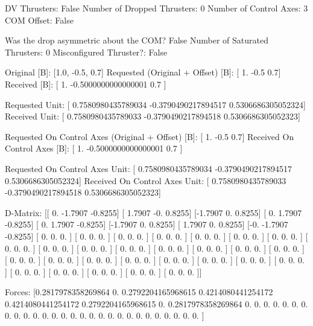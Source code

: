 DV Thrusters:	False
Number of Dropped Thrusters:	0
Number of Control Axes:	3
COM Offset:	False

Was the drop asymmetric about the COM?	False
Number of Saturated Thrusters:	0
Misconfigured Thruster?:	False

Original [B]:	[1.0, -0.5, 0.7]
Requested (Original + Offset) [B]:	[ 1.  -0.5  0.7]
Received [B]:		[ 1.                 -0.5000000000000001  0.7               ]

Requested Unit:		[ 0.7580980435789034 -0.3790490217894517  0.5306686305052324]
Received Unit:		[ 0.7580980435789033 -0.3790490217894518  0.5306686305052323]

Requested On Control Axes (Original + Offset) [B]:	[ 1.  -0.5  0.7]
Received On Control Axes [B]:		[ 1.                 -0.5000000000000001  0.7               ]

Requested On Control Axes Unit:		[ 0.7580980435789034 -0.3790490217894517  0.5306686305052324]
Received On Control Axes Unit:		[ 0.7580980435789033 -0.3790490217894518  0.5306686305052323]

D-Matrix:
[[ 0.     -1.7907 -0.8255]
 [ 1.7907 -0.      0.8255]
 [-1.7907  0.      0.8255]
 [ 0.      1.7907 -0.8255]
 [ 0.      1.7907 -0.8255]
 [-1.7907  0.      0.8255]
 [ 1.7907  0.      0.8255]
 [-0.     -1.7907 -0.8255]
 [ 0.      0.      0.    ]
 [ 0.      0.      0.    ]
 [ 0.      0.      0.    ]
 [ 0.      0.      0.    ]
 [ 0.      0.      0.    ]
 [ 0.      0.      0.    ]
 [ 0.      0.      0.    ]
 [ 0.      0.      0.    ]
 [ 0.      0.      0.    ]
 [ 0.      0.      0.    ]
 [ 0.      0.      0.    ]
 [ 0.      0.      0.    ]
 [ 0.      0.      0.    ]
 [ 0.      0.      0.    ]
 [ 0.      0.      0.    ]
 [ 0.      0.      0.    ]
 [ 0.      0.      0.    ]
 [ 0.      0.      0.    ]
 [ 0.      0.      0.    ]
 [ 0.      0.      0.    ]
 [ 0.      0.      0.    ]
 [ 0.      0.      0.    ]
 [ 0.      0.      0.    ]
 [ 0.      0.      0.    ]
 [ 0.      0.      0.    ]
 [ 0.      0.      0.    ]
 [ 0.      0.      0.    ]
 [ 0.      0.      0.    ]]

Forces:
[0.2817978358269864 0.                 0.2792204165968615
 0.4214080441254172 0.4214080441254172 0.2792204165968615
 0.                 0.2817978358269864 0.
 0.                 0.                 0.
 0.                 0.                 0.
 0.                 0.                 0.
 0.                 0.                 0.
 0.                 0.                 0.
 0.                 0.                 0.
 0.                 0.                 0.
 0.                 0.                 0.
 0.                 0.                 0.                ]

